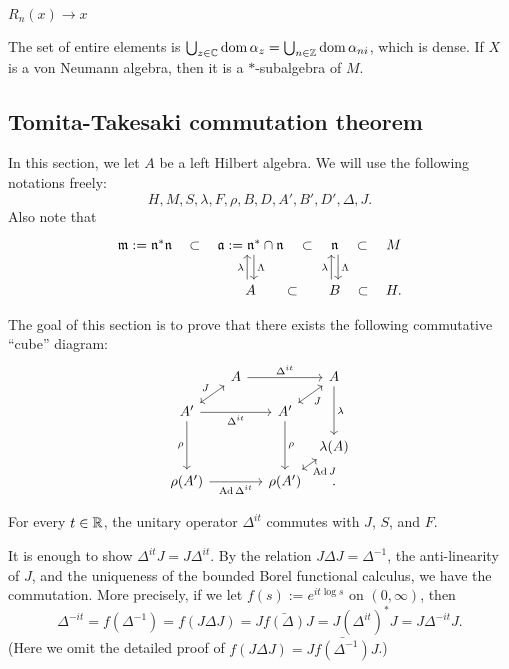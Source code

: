 \documentclass{../../small}
\begin{document}
\begin{prop}
\begin{parts}
\item $R_n(x)\to x$
\end{parts}
\end{prop}

\begin{defn}
The set of entire elements is $\bigcup_{z\in\mathbb{C}}\operatorname{dom}\alpha_z=\bigcup_{n\in\mathbb{Z}}\operatorname{dom}\alpha_{ni}$, which is dense.
If $X$ is a von Neumann algebra, then it is a $*$-subalgebra of $M$.

\end{defn}





\subsection{Tomita-Takesaki commutation theorem}

In this section, we let $A$ be a left Hilbert algebra.
We will use the following notations freely:
\[H,M,S,\lambda,F,\rho,B,D,A',B',D',\Delta,J.\]
Also note that
\[\begin{tikzcd}
\fm:=\fn^*\fn \rar[phantom,"\subset"] & \fa:=\fn^*\cap\fn \rar[phantom,"\subset"]\dar[shift left]{\Lambda} & \fn \rar[phantom,"\subset"]\dar[shift left]{\Lambda} & M\\
& A \rar[phantom,"\subset"]\uar[shift left]{\lambda} & B \rar[phantom,"\subset"]\uar[shift left]{\lambda} & H.
\end{tikzcd}\]

The goal of this section is to prove that there exists the following commutative ``cube'' diagram:
\[\begin{tikzcd}[column sep={3.5em,between origins},row sep={2.5em,between origins}]
&A\ar{rr}{\Delta^{it}}&&A\ar{dd}{\lambda}\\
A'\ar[<->]{ur}{J}\ar[swap]{rr}{\Delta^{it}}\ar[swap]{dd}{\rho}&&A'\ar[<->,swap]{ur}{J}\ar{dd}{\rho}&\\
&&&\lambda(A)\\
\rho(A')\ar[swap]{rr}{\Ad\Delta^{it}}&&\rho(A')\ar[<->,swap]{ur}{\Ad J}&.
\end{tikzcd}\]


\begin{lem*}
For every $t\in\mathbb{R}$, the unitary operator $\Delta^{it}$ commutes with $J$, $S$, and $F$.
\end{lem*}
\begin{pf}
It is enough to show $\Delta^{it}J=J\Delta^{it}$.
By the relation $J\Delta J=\Delta^{-1}$, the anti-linearity of $J$, and the uniqueness of the bounded Borel functional calculus, we have the commutation.
More precisely, if we let $f(s):=e^{it\log s}$ on $(0,\infty)$, then
\[\Delta^{-it}=f(\Delta^{-1})=f(J\Delta J)=J\bar{f(\Delta)}J=J(\Delta^{it})^*J=J\Delta^{-it}J.\]
(Here we omit the detailed proof of $f(J\Delta J)=J\bar{f(\Delta^{-1})}J$.)
\end{pf}
\end{document}
